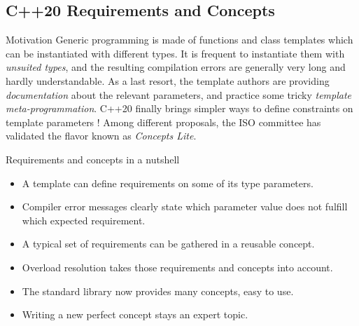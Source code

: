 \subsection[tmpl]{C++20 Requirements and Concepts}

\begin{frame}[fragile]
  \begin{block}{Motivation}
    Generic programming is made of functions and class templates
    which can be instantiated with different types. It is frequent
    to instantiate them with {\em unsuited types}, and the resulting
    compilation errors are generally very long and hardly understandable.
    As a last resort, the template authors are providing {\em documentation}
    about the relevant parameters, and practice some tricky
    {\em template meta-programmation}. C++20 finally brings simpler ways to
    define constraints on template parameters ! Among different proposals,
    the ISO committee has validated the flavor known as {\em Concepts Lite}.
  \end{block}
\end{frame}

\begin{frame}[fragile]
  \begin{block}{Requirements and concepts in a nutshell}
    \begin{itemize}
    \item A template can define requirements on some of its type parameters.
    \item Compiler error messages clearly state which parameter value does not fulfill which expected requirement.
    \item A typical set of requirements can be gathered in a reusable concept.
    \item Overload resolution takes those requirements and concepts into account.
    \item The standard library now provides many concepts, easy to use.
    \item Writing a new perfect concept stays an expert topic.
    \end{itemize}
  \end{block}
\end{frame}

